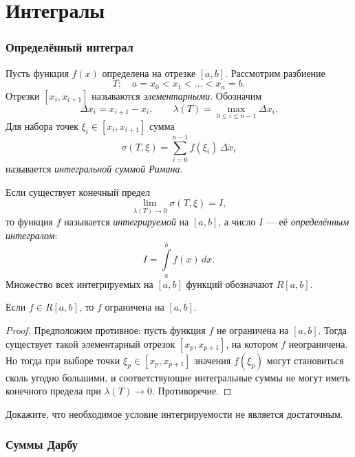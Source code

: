 \part{Интегралы}

\section{Определённый интеграл}

\begin{definition}
Пусть функция $f(x)$ определена на отрезке $[a,b]$.
Рассмотрим разбиение
\[
T:\quad a=x_0<x_1<\dots<x_n=b.
\]
Отрезки $[x_i,x_{i+1}]$ называются \emph{элементарными}.
Обозначим
\[
\Delta x_i=x_{i+1}-x_i,\qquad \lambda(T)=\max_{0\leqslant i\leqslant n-1}\Delta x_i.
\]
Для набора точек $\xi_i\in[x_i,x_{i+1}]$ сумма
\[
\sigma(T,\xi)=\sum\limits_{i=0}^{n-1} f(\xi_i)\,\Delta x_i
\]
называется \emph{интегральной суммой Римана}.
\end{definition}

\begin{definition}
Если существует конечный предел
\[
\lim_{\lambda(T)\to 0}\sigma(T,\xi)=I,
\]
то функция $f$ называется \emph{интегрируемой} на $[a,b]$, а число $I$ — её \emph{определённым интегралом}:
\[
I=\int\limits_a^b f(x)\,dx.
\]
Множество всех интегрируемых на $[a,b]$ функций обозначают $R[a,b]$.
\end{definition}

\begin{theorem}
Если $f\in R[a,b]$, то $f$ ограничена на $[a,b]$.


\begin{proof}
Предположим противное: пусть функция $f$ не ограничена на $[a,b]$.
Тогда существует такой элементарный отрезок $[x_p,x_{p+1}]$, на котором $f$ неограничена.
Но тогда при выборе точки $\xi_p\in[x_p,x_{p+1}]$ значения $f(\xi_p)$ могут становиться сколь угодно большими, и соответствующие интегральные суммы не могут иметь конечного предела при $\lambda(T)\to 0$.
Противоречие.
\end{proof}

\end{theorem}

\begin{task}
    Докажите, что необходимое условие интегрируемости не является достаточным.
\end{task}

\section{Суммы Дарбу}

